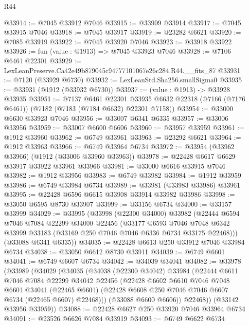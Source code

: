 \begin{lexlean}{R44}
\begin{coremodule}
{@33914 := @7045 @33912 @7046
@33915 := @33909 @33914
@33917 := @7045 @33915 @7046
@33918 := @7045 @33917
@33919 := @23282 @6621
@33920 := @7085 @33919
@33922 := @7045 @33920 @7046
@33923 := @33918 @33922
@33926 := fun (value : @1913) => @7045 @33923 @7046
@33928 := @7106 @6461 @22301
@33929 := LexLeanPreserve.Ca42e49b879045c94777101067e26c284.R44.__fits_87
@33931 := @7120 (@33929 @6730)
@33932 := LexLeanStd.Sha256.smallSigma0
@33935 := @33931 (@1912 (@33932 @6730))
@33937 := (value : @1913) -> @33928 @33935
@33951 := @7137
    @6461
    @22301
    @33935
    @6632
    @22318
    (@7166 (@7176 @6461))
    (@7182 (@7183 (@7184 @6632) @22301 @7158))
@33954 := @33000 @6630 @33923 @7046
@33956 := @33007 @6341 @6335
@33957 := @33006 @33956
@33959 := @33007 @6600 @6606
@33960 := @33957 @33959
@33961 := @1912 @33960
@33962 := @6749 @33961
@33963 := @23292 @6621
@33964 := @1912 @33963
@33966 := @6749 @33964 @6734
@33972 := @33954 (@33962 @33966) (@1912 (@33006 @33960 @33963))
@33978 := @22428 @6617 @6629 @33917 @33922 @33961 @33966
@33981 := @33000 @6616 @33915 @7046
@33982 := @1912 @33956
@33983 := @6749 @33982
@33984 := @1912 @33959
@33986 := @6749 @33984 @6734
@33989 := @33981 (@33983 @33986) @33961
@33995 := @22428 @6596 @6615 @33908 @33914 @33982 @33986
@33998 := @33050 @6595 @8730 @33907
@33999 := @33156 @6734
@34000 := @33157 @33999
@34029 := @33995
    (@33998
      (@22300 @34000)
      @33982
      (@22444
        @6594
        @7046
        @7084
        @22299
        @34000
        @22456
        (@33177
          @6593
          @7046
          @7048
          @6342
          @33999
          @33183
          (@33169 @250 @7046 @7046 @6336 @6734 @33175 @22468)))
      (@33088 @6341 @6335))
@34035 := @22428 @6613 @250 @33912 @7046 @33984 @6734
@34038 := @33050 @6612 @8730 @33911
@34039 := @6749 @6601
@34041 := @6749 @6607 @6734
@34042 := @34039 @34041
@34082 := @33978
    (@33989
      (@34029
        (@34035
          (@34038
            (@22300 @34042)
            @33984
            (@22444
              @6611
              @7046
              @7084
              @22299
              @34042
              @22456
              (@22428
                @6602
                @6610
                @7046
                @7048
                @6601
                @34041
                (@22465 @6601)
                (@22428 @6608 @250 @7046 @7046 @6607 @6734 (@22465 @6607) @22468)))
            (@33088 @6600 @6606))
          @22468))
      (@33142 @33956 @33959))
@34088 := @22428 @6627 @250 @33920 @7046 @33964 @6734
@34091 := @23526 @6626 @7084 @33919
@34093 := @6749 @6622 @6734
}
\end{coremodule}
\end{lexlean}
